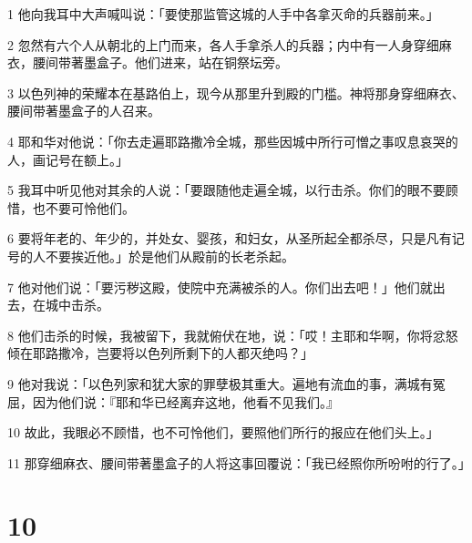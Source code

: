 \par 1 他向我耳中大声喊叫说：「要使那监管这城的人手中各拿灭命的兵器前来。」
\par 2 忽然有六个人从朝北的上门而来，各人手拿杀人的兵器；内中有一人身穿细麻衣，腰间带著墨盒子。他们进来，站在铜祭坛旁。
\par 3 以色列神的荣耀本在基路伯上，现今从那里升到殿的门槛。神将那身穿细麻衣、腰间带著墨盒子的人召来。
\par 4 耶和华对他说：「你去走遍耶路撒冷全城，那些因城中所行可憎之事叹息哀哭的人，画记号在额上。」
\par 5 我耳中听见他对其余的人说：「要跟随他走遍全城，以行击杀。你们的眼不要顾惜，也不要可怜他们。
\par 6 要将年老的、年少的，并处女、婴孩，和妇女，从圣所起全都杀尽，只是凡有记号的人不要挨近他。」於是他们从殿前的长老杀起。
\par 7 他对他们说：「要污秽这殿，使院中充满被杀的人。你们出去吧！」他们就出去，在城中击杀。
\par 8 他们击杀的时候，我被留下，我就俯伏在地，说：「哎！主耶和华啊，你将忿怒倾在耶路撒冷，岂要将以色列所剩下的人都灭绝吗？」
\par 9 他对我说：「以色列家和犹大家的罪孽极其重大。遍地有流血的事，满城有冤屈，因为他们说：『耶和华已经离弃这地，他看不见我们。』
\par 10 故此，我眼必不顾惜，也不可怜他们，要照他们所行的报应在他们头上。」
\par 11 那穿细麻衣、腰间带著墨盒子的人将这事回覆说：「我已经照你所吩咐的行了。」

\chapter{10}


